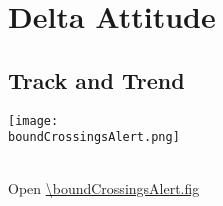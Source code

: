 %
% 
% 
%
%
\section{Delta Attitude}

\subsection{Track and Trend}

\begin{center}
  \texttt{[image: \\boundCrossingsAlert.png]}
\end{center}
\boundCrossingsAlertCaption\\
Open \url{\boundCrossingsAlert.fig}

